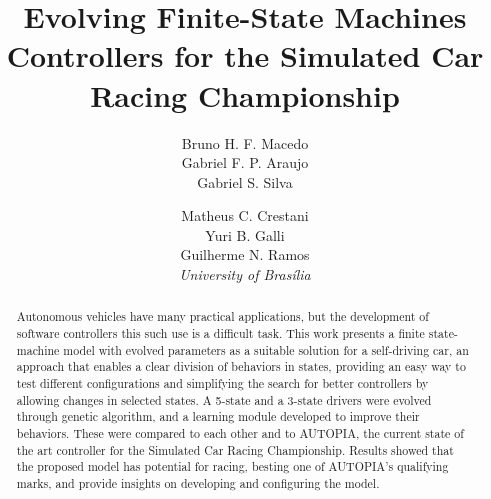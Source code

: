 \documentclass[a4paper]{sbgames}
\title{Evolving Finite-State Machines Controllers for the Simulated Car Racing Championship}
\author{Bruno H. F. Macedo\\Gabriel F. P. Araujo\\Gabriel S. Silva\\\and Matheus C. Crestani\\Yuri B. Galli\\Guilherme N. Ramos\\\hspace{-12em}\textit{University of Bras\'{i}lia}}
\begin{document}
	\maketitle

	\begin{abstract}
		Autonomous vehicles have many practical applications, but the development of software controllers this such use is a difficult task. This work presents a finite state-machine model with evolved parameters as a suitable solution for a self-driving car, an approach that enables a clear division of behaviors in states, providing an easy way to test different configurations and simplifying the search for better controllers by allowing changes in selected states. A 5-state and a 3-state drivers were evolved through genetic algorithm, and a learning module developed to improve their behaviors. These were compared to each other and to AUTOPIA, the current state of the art controller for the Simulated Car Racing Championship. Results showed that the proposed model has potential for racing, besting one of AUTOPIA's qualifying marks, and provide insights on developing and configuring the model.
	\end{abstract}

	\keywordlist
	\contactlist

	\FloatBarrier%


	
	
\end{document}
